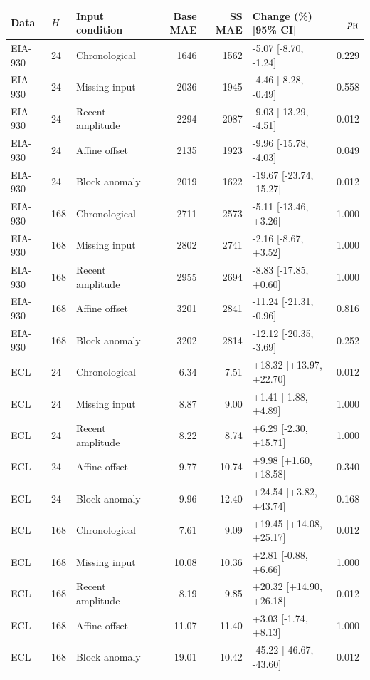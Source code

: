 {
\footnotesize
\begin{longtable}{lllrrp{3.65cm}r}
\toprule
Data & $H$ & Input condition & Base MAE & SS MAE & Change (\%) [95\% CI] & $p_{\rm H}$ \\
\midrule
\endhead
EIA-930 & 24 & Chronological & 1646 & 1562 & -5.07 [-8.70, -1.24] & 0.229 \\
EIA-930 & 24 & Missing input & 2036 & 1945 & -4.46 [-8.28, -0.49] & 0.558 \\
EIA-930 & 24 & Recent amplitude & 2294 & 2087 & -9.03 [-13.29, -4.51] & 0.012 \\
EIA-930 & 24 & Affine offset & 2135 & 1923 & -9.96 [-15.78, -4.03] & 0.049 \\
EIA-930 & 24 & Block anomaly & 2019 & 1622 & -19.67 [-23.74, -15.27] & 0.012 \\
EIA-930 & 168 & Chronological & 2711 & 2573 & -5.11 [-13.46, +3.26] & 1.000 \\
EIA-930 & 168 & Missing input & 2802 & 2741 & -2.16 [-8.67, +3.52] & 1.000 \\
EIA-930 & 168 & Recent amplitude & 2955 & 2694 & -8.83 [-17.85, +0.60] & 1.000 \\
EIA-930 & 168 & Affine offset & 3201 & 2841 & -11.24 [-21.31, -0.96] & 0.816 \\
EIA-930 & 168 & Block anomaly & 3202 & 2814 & -12.12 [-20.35, -3.69] & 0.252 \\
ECL & 24 & Chronological & 6.34 & 7.51 & +18.32 [+13.97, +22.70] & 0.012 \\
ECL & 24 & Missing input & 8.87 & 9.00 & +1.41 [-1.88, +4.89] & 1.000 \\
ECL & 24 & Recent amplitude & 8.22 & 8.74 & +6.29 [-2.30, +15.71] & 1.000 \\
ECL & 24 & Affine offset & 9.77 & 10.74 & +9.98 [+1.60, +18.58] & 0.340 \\
ECL & 24 & Block anomaly & 9.96 & 12.40 & +24.54 [+3.82, +43.74] & 0.168 \\
ECL & 168 & Chronological & 7.61 & 9.09 & +19.45 [+14.08, +25.17] & 0.012 \\
ECL & 168 & Missing input & 10.08 & 10.36 & +2.81 [-0.88, +6.66] & 1.000 \\
ECL & 168 & Recent amplitude & 8.19 & 9.85 & +20.32 [+14.90, +26.18] & 0.012 \\
ECL & 168 & Affine offset & 11.07 & 11.40 & +3.03 [-1.74, +8.13] & 1.000 \\
ECL & 168 & Block anomaly & 19.01 & 10.42 & -45.22 [-46.67, -43.60] & 0.012 \\

\end{longtable}}
